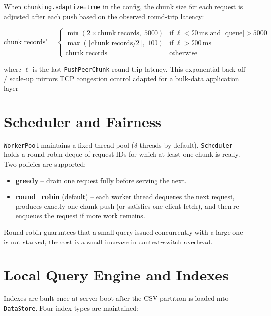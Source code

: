 \documentclass[conference]{IEEEtran}
\begin{document}
When \texttt{chunking.adaptive=true} in the config, the chunk size for each
request is adjusted after each push based on the observed round-trip latency:

\[
  \text{chunk\_records}' = \begin{cases}
    \min(2 \times \text{chunk\_records},\; 5000) & \text{if } \ell < 20\,\text{ms and } |\text{queue}| > 5000 \\
    \max(\lfloor\text{chunk\_records}/2\rfloor,\; 100) & \text{if } \ell > 200\,\text{ms} \\
    \text{chunk\_records} & \text{otherwise}
  \end{cases}
\]

where $\ell$ is the last \texttt{PushPeerChunk} round-trip latency. This
exponential back-off / scale-up mirrors TCP congestion control adapted for
a bulk-data application layer.

\section{Scheduler and Fairness}
\label{sec:scheduler}

\texttt{WorkerPool} maintains a fixed thread pool (8 threads by default).
\texttt{Scheduler} holds a round-robin deque of request IDs for which at
least one chunk is ready. Two policies are supported:

\begin{itemize}
  \item \textbf{greedy} -- drain one request fully before serving the next.
  \item \textbf{round\_robin} (default) -- each worker thread dequeues the
        next request, produces exactly one chunk-push (or satisfies one client
        fetch), and then re-enqueues the request if more work remains.
\end{itemize}

Round-robin guarantees that a small query issued concurrently with a large
one is not starved; the cost is a small increase in context-switch overhead.

\section{Local Query Engine and Indexes}
\label{sec:query}

Indexes are built once at server boot after the CSV partition is loaded into
\texttt{DataStore}. Four index types are maintained:
\end{document}
